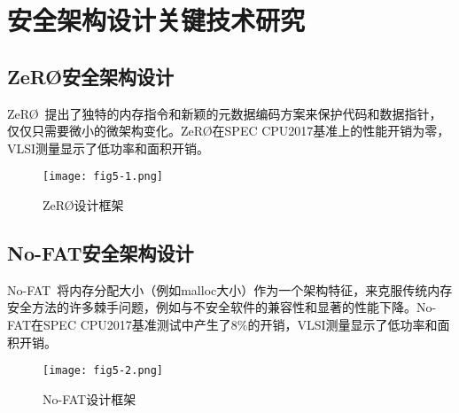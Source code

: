 %
%

\chapter{安全架构设计关键技术研究}\label{chap5}

\section{ZeRØ安全架构设计}

ZeRØ~\cite{ziad2021zero}提出了独特的内存指令和新颖的元数据编码方案来保护代码和数据指针，仅仅只需要微小的微架构变化。ZeRØ在SPEC CPU2017基准上的性能开销为零，VLSI测量显示了低功率和面积开销。

\begin{figure}[h!]
\centering
\texttt{[image: fig5-1.png]}
\caption{ZeRØ设计框架}
\label{fig5.1}
\end{figure}

\section{No-FAT安全架构设计}

No-FAT~\cite{ziad2021no}将内存分配大小（例如malloc大小）作为一个架构特征，来克服传统内存安全方法的许多棘手问题，例如与不安全软件的兼容性和显著的性能下降。No-FAT在SPEC CPU2017基准测试中产生了8\%的开销，VLSI测量显示了低功率和面积开销。

\begin{figure}[h!]
\centering
\texttt{[image: fig5-2.png]}
\caption{No-FAT设计框架}
\label{fig5.2}
\end{figure}